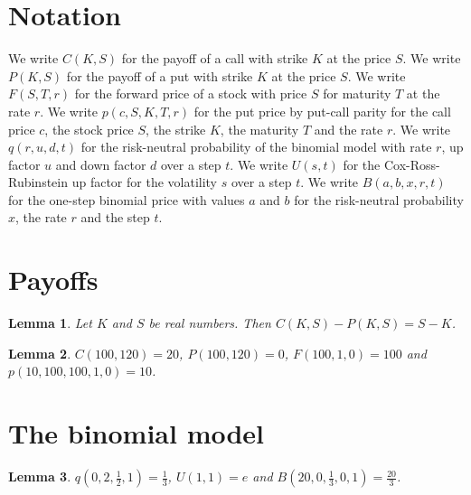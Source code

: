 \documentclass{article}
\newtheorem{lemma}{Lemma}
\begin{document}
\section{Notation}

We write $C(K,S)$ for the payoff of a call with strike $K$ at the price $S$.
We write $P(K,S)$ for the payoff of a put with strike $K$ at the price $S$.
We write $F(S,T,r)$ for the forward price of a stock with price $S$ for maturity $T$ at the rate $r$.
We write $p(c,S,K,T,r)$ for the put price by put-call parity for the call price $c$, the stock price $S$, the strike $K$, the maturity $T$ and the rate $r$.
We write $q(r,u,d,t)$ for the risk-neutral probability of the binomial model with rate $r$, up factor $u$ and down factor $d$ over a step $t$.
We write $U(s,t)$ for the Cox-Ross-Rubinstein up factor for the volatility $s$ over a step $t$.
We write $B(a,b,x,r,t)$ for the one-step binomial price with values $a$ and $b$ for the risk-neutral probability $x$, the rate $r$ and the step $t$.

\section{Payoffs}

\begin{lemma}\label{difference}
Let $K$ and $S$ be real numbers. Then $C(K,S)-P(K,S)=S-K$.
\end{lemma}

\begin{lemma}\label{payoffs}
$C(100,120)=20$, $P(100,120)=0$, $F(100,1,0)=100$ and $p(10,100,100,1,0)=10$.
\end{lemma}

\section{The binomial model}

\begin{lemma}\label{binomial}
$q(0,2,\frac12,1)=\frac13$, $U(1,1)=e$ and $B(20,0,\frac13,0,1)=\frac{20}{3}$.
\end{lemma}
\end{document}
